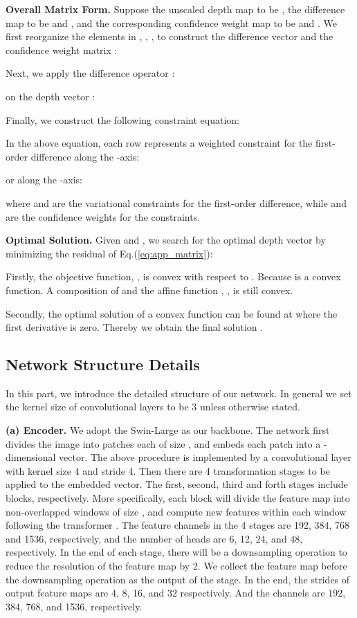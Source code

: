 \documentclass{article} \usepackage{iclr2023_conference, times}
\newcommand{\formattedparagraph}[1]{\noindent \textbf{#1}}
\begin{document}
\formattedparagraph{Overall Matrix Form.}
Suppose the unscaled depth map to be , the difference map to be  and , and the corresponding confidence weight map to be  and . We first reorganize the elements in , , ,  to construct the difference vector  and the confidence weight matrix : 


Next, we apply the difference operator :

on the depth vector :

Finally, we construct the following constraint equation:

In the above equation, each row represents a weighted constraint for the first-order difference along the -axis:

or along the -axis:

where  and  are the variational constraints for the first-order difference, while  and  are the confidence weights for the constraints. 

\formattedparagraph{Optimal Solution.}
Given  and , we search for the optimal depth vector  by minimizing the residual of Eq.(\ref{eq:app_matrix}):

Firstly, the objective function, , is convex with respect to . Because  is a convex function. A composition of  and the affine function , , is still convex. 

Secondly, the optimal solution of a convex function can be found at where the first derivative is zero. Thereby we obtain the final solution .
\subsection{Network Structure Details}
In this part, we introduce the detailed structure of our network. In general we set the kernel size of convolutional layers to be 3 unless otherwise stated.

\formattedparagraph{(a) Encoder.} We adopt the Swin-Large \citep{liu2021swin} as our backbone. The network first divides the image into patches each of size , and embeds each patch into a -dimensional vector. The above procedure is implemented by a convolutional layer with kernel size 4 and stride 4. Then there are 4  transformation stages to be applied to the embedded vector. The first, second, third and forth stages include  blocks, respectively. More specifically, each block will divide the feature map into non-overlapped windows of size  , and compute new features within each window following the transformer \citep{vaswani2017attention}. The feature channels in the 4 stages are 192, 384, 768 and 1536, respectively, and the number of heads are 6, 12, 24, and 48, respectively. In the end of each stage, there will be a downsampling operation to reduce the resolution of the feature map by 2. We collect the feature map before the downsampling operation as the output of the stage. In the end, the strides of output feature maps are 4, 8, 16, and 32 respectively. And the channels are 192, 384, 768, and 1536, respectively.
\end{document}
